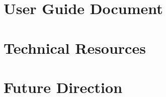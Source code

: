 \documentclass{article}
\begin{document}
\newpage

\section{User Guide Document}

\newpage

\section{Technical Resources}

\newpage

\section{Future Direction}
\end{document}
